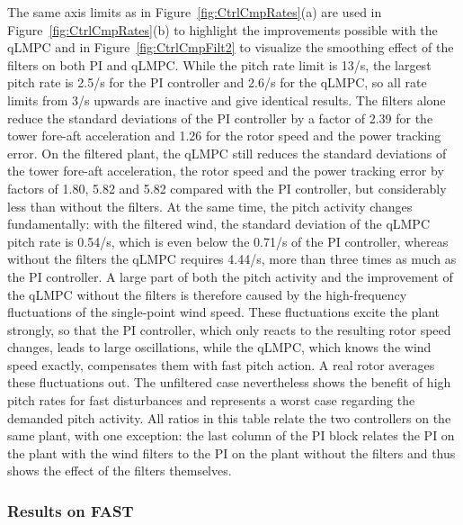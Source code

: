 The same axis limits as in Figure~\ref{fig:CtrlCmpRates}(a) are used in Figure~\ref{fig:CtrlCmpRates}(b) to highlight the improvements possible with the qLMPC and in Figure~\ref{fig:CtrlCmpFilt2} to visualize the smoothing effect of the filters on both PI and qLMPC. While the pitch rate limit is 13\textdegree/s, the largest pitch rate is 2.5\textdegree/s for the PI controller and 2.6\textdegree/s for the qLMPC, so all rate limits from 3\textdegree/s upwards are inactive and give identical results. The filters alone reduce the standard deviations of the PI controller by a factor of 2.39 for the tower fore-aft acceleration and 1.26 for the rotor speed and the power tracking error. On the filtered plant, the qLMPC still reduces the standard deviations of the tower fore-aft acceleration, the rotor speed and the power tracking error by factors of 1.80, 5.82 and 5.82 compared with the PI controller, but considerably less than without the filters. At the same time, the pitch activity changes fundamentally: with the filtered wind, the standard deviation of the qLMPC pitch rate is 0.54\textdegree/s, which is even below the 0.71\textdegree/s of the PI controller, whereas without the filters the qLMPC requires 4.44\textdegree/s, more than three times as much as the PI controller. A large part of both the pitch activity and the improvement of the qLMPC without the filters is therefore caused by the high-frequency fluctuations of the single-point wind speed. These fluctuations excite the plant strongly, so that the PI controller, which only reacts to the resulting rotor speed changes, leads to large oscillations, while the qLMPC, which knows the wind speed exactly, compensates them with fast pitch action. A real rotor averages these fluctuations out. The unfiltered case nevertheless shows the benefit of high pitch rates for fast disturbances and represents a worst case regarding the demanded pitch activity.
%
All ratios in this table relate the two controllers on the same plant, with one exception: the last column of the PI block relates the PI on the plant with the wind filters to the PI on the plant without the filters and thus shows the effect of the filters themselves.

\subsubsection{Results on FAST}\label{subsubsec:qLMPCFASTresults}

